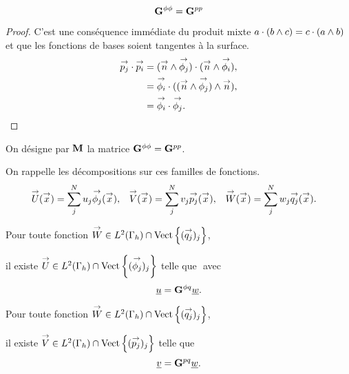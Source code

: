   \begin{prop}
    \begin{equation*}
      \mG{\phi}{\phi} = \mG{p}{p}
    \end{equation*}
  \end{prop}
  \begin{proof}
    C'est une conséquence immédiate du produit mixte \(a\cdot (b \pvect c) = c\cdot (a \pvect b)\) et que les fonctions de bases soient tangentes à la surface.
    \[
      \begin{aligned}
        \pj \cdot \pii &= (\vn \pvect \phij) \cdot ( \vn \pvect \phii),
        \\
        &= \phii \cdot ( (\vn \pvect \phij) \pvect \vn),
        \\
        &= \phii \cdot \phij.
      \end{aligned}
    \]
  \end{proof}

  \begin{defn}
    On désigne par \(\mM\) la matrice \(\mG{\phi}{\phi} = \mG{p}{p}\).
  \end{defn}

  On rappelle les décompositions sur ces familles de fonctions.
  \begin{align*}
    \vect{U}(\vx) &= \sum_j^N  u_j \phij(\vx),
    &
    \vect{V}(\vx) &= \sum_j^N  v_j \pj(\vx),
    &
    \vect{W}(\vx) &= \sum_j^N  w_j \qj(\vx).
  \end{align*}

  \begin{prop}
    Pour toute fonction \(\vect{W} \in L^2(\Gamma_h)\cap\Vect{(\qj)_j}\),

    il existe \(\vect{U} \in L^2(\Gamma_h) \cap \Vect{(\phij)_j} \) telle que \(\) avec
    \begin{equation*}
      \comp{u} = \mG{\phi}{q}\comp{w}.
    \end{equation*}
  \end{prop}

  \begin{prop}
    Pour toute fonction \(\vect{W} \in L^2(\Gamma_h)\cap\Vect{(\qj)_j}\),

    il existe \(\vect{V} \in L^2(\Gamma_h) \cap \Vect{(\pj)_j} \) telle que
    \begin{equation*}
      \comp{v} = \mG{p}{q}\comp{w}.
    \end{equation*}
  \end{prop}

